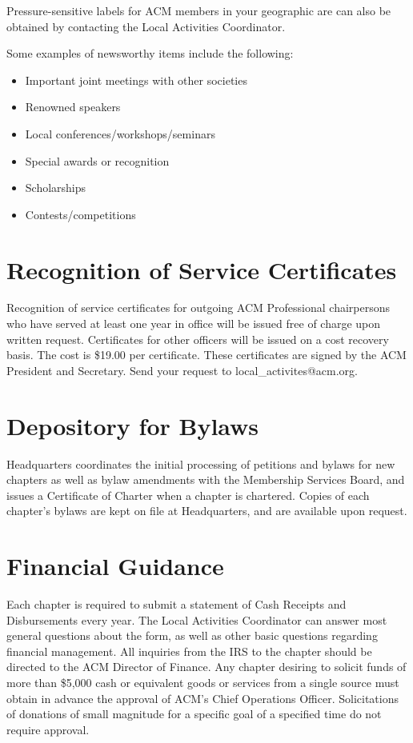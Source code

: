 Pressure-sensitive labels for ACM members in your geographic are can also be obtained by contacting the Local Activities Coordinator.

Some examples of newsworthy items include the following:
\begin{itemize}
	\item Important joint meetings with other societies
	\item Renowned speakers
	\item Local conferences/workshops/seminars
	\item Special awards or recognition
	\item Scholarships
	\item Contests/competitions
\end{itemize}

\section*{Recognition of Service Certificates}
Recognition of service certificates for outgoing ACM Professional chairpersons who have served at least one year in office will be issued free of charge upon written request. Certificates for other officers will be issued on a cost recovery basis. The cost is \$19.00 per certificate. These certificates are signed by the ACM President and Secretary. Send your request to local\_activites@acm.org.

\section*{Depository for Bylaws}
Headquarters coordinates the initial processing of petitions and bylaws for new chapters as well as bylaw amendments with the Membership Services Board, and issues a Certificate of Charter when a chapter is chartered. Copies of each chapter's bylaws are kept on file at Headquarters, and are available upon request.

\section*{Financial Guidance}
Each chapter is required to submit a statement of Cash Receipts and Disbursements every year. The Local Activities Coordinator can answer most general questions about the form, as well as other basic questions regarding financial management. All inquiries from the IRS to the chapter should be directed to the ACM Director of Finance. Any chapter desiring to solicit funds of more than \$5,000 cash or equivalent goods or services from a single source must obtain in advance the approval of ACM's Chief Operations Officer. Solicitations of donations of small magnitude for a specific goal of a specified time do not require approval.


\